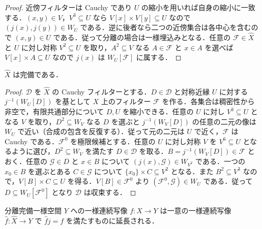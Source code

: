 \begin{proof}
近傍フィルターは Cauchy であり $U$ の縮小を用いれば自身の縮小に一致する．$(x,y)\in V$，$V^3\subseteq U$ なら $V[x]\times V[y]\subseteq U$ なので $(j(x),j(y))\in W_U$ である．逆に後者なら二つの近傍集合は各中心を含むので $(x,y)\in U$ である．従って分離の場合は一様埋込みとなる．任意の $\mathcal F\in\widehat X$ と $U$ に対し対称 $V^2\subseteq U$ を取り，$A^2\subseteq V$ なる $A\in\mathcal F$ と $x\in A$ を選べば $V[x]\times A\subseteq U$ なので $j(x)$ は $W_U[\mathcal F]$ に属する．
\end{proof}
\begin{prop}[完備化の完備性]
$\widehat X$ は完備である．
\end{prop}
\begin{proof}
$\mathcal D$ を $\widehat X$ の Cauchy フィルターとする．$D\in\mathcal D$ と対称近縁 $U$ に対する $j^{-1}(W_U[D])$ を基として $X$ 上のフィルター $\mathcal F$ を作る．各集合は稠密性から非空で，有限共通部分について $D,U$ を縮小できる．任意の $U$ に対し $V^3\subseteq U$ となる $V$ を取り，$D^2\subseteq W_V$ なる $D$ を選ぶと $j^{-1}(W_V[D])$ の任意の二元の像は $W_U$ で近い（合成の包含を反復する）．従って元の二元は $U$ で近く，$\mathcal F$ は Cauchy である．$\mathcal F^0$ を極限候補とする．任意の $U$ に対し対称 $V$ を $V^6\subseteq U$ となるように選び，$D^2\subseteq W_V$ を満たす $D\in\mathcal D$ を取る．$B=j^{-1}(W_V[D])\in\mathcal F$ とおく．任意の $\mathcal G\in D$ と $x\in B$ について $(j(x),\mathcal G)\in W_{V^2}$ である．一つの $x_0\in B$ を選ぶとある $C\in\mathcal G$ について $\{x_0\}\times C\subseteq V^2$ となる．また $B^2\subseteq V^3$ なので，$V[B]\times C\subseteq U$ を得る．$V[B]\in\mathcal F^0$ より $(\mathcal F^0,\mathcal G)\in W_U$ である．従って $D\subseteq W_U[\mathcal F^0]$ となり $\mathcal D$ は収束する．
\end{proof}
\begin{prop}[完備化の普遍性]
分離完備一様空間 $Y$ への一様連続写像 $f:X\to Y$ は一意の一様連続写像 $\widehat f:\widehat X\to Y$ で $\widehat f j=f$ を満たすものに延長される．
\end{prop}
